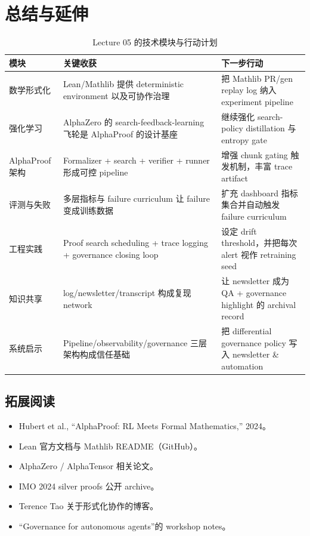 \section{总结与延伸}
\begin{table}[H]
\centering
\begin{tabular}{p{4cm}p{6cm}p{5cm}}
\toprule
模块 & 关键收获 & 下一步行动 \\
\midrule
数学形式化 & Lean/Mathlib 提供 deterministic environment 以及可协作治理 & 把 Mathlib PR/gen replay log 纳入 experiment pipeline \\
强化学习 & AlphaZero 的 search-feedback-learning 飞轮是 AlphaProof 的设计基座 & 继续强化 search-policy distillation 与 entropy gate \\
AlphaProof 架构 & Formalizer + search + verifier + runner 形成可控 pipeline & 增强 chunk gating 触发机制，丰富 trace artifact \\
评测与失败 & 多层指标与 failure curriculum 让 failure 变成训练数据 & 扩充 dashboard 指标集合并自动触发 failure curriculum \\
工程实践 & Proof search scheduling + trace logging + governance closing loop & 设定 drift threshold，并把每次 alert 视作 retraining seed \\
知识共享 & log/newsletter/transcript 构成复现 network & 让 newsletter 成为 QA + governance highlight 的 archival record \\
系统启示 & Pipeline/observability/governance 三层架构构成信任基础 & 把 differential governance policy 写入 newsletter \& automation \\
\bottomrule
\end{tabular}
\caption{Lecture 05 的技术模块与行动计划}
\end{table}

\subsection{拓展阅读}
\begin{itemize}
    \item Hubert et al., ``AlphaProof: RL Meets Formal Mathematics,'' 2024。
    \item Lean 官方文档与 Mathlib README（GitHub）。
    \item AlphaZero / AlphaTensor 相关论文。
    \item IMO 2024 silver proofs 公开 archive。
    \item Terence Tao 关于形式化协作的博客。
    \item “Governance for autonomous agents”的 workshop notes。
\end{itemize}

